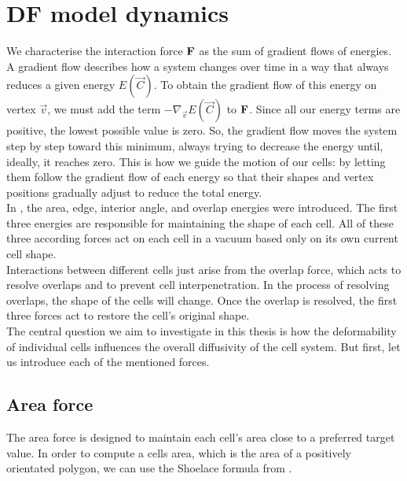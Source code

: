 \section{DF model dynamics} 
We characterise the interaction force $\mathbf{F}$ as the sum of gradient flows of energies. \\
A gradient flow describes how a system changes over time in a way that always reduces a given energy $E(\vec{C})$.
To obtain the gradient flow of this energy on vertex $\vec{v}$, we must add the term $-\nabla_{\vec{v}} E(\vec{C})$ to $\mathbf{F}$.
Since all our energy terms are positive, the lowest possible value is zero.  
So, the gradient flow moves the system step by step toward this minimum, always trying to decrease the energy until, ideally, it reaches zero. 
This is how we guide the motion of our cells: by letting them follow the gradient flow of each energy so that their shapes and vertex positions gradually adjust to reduce the total energy. \\
In \cite{Vogel2023}, the area, edge, interior angle, and overlap energies were introduced.
The first three energies are responsible for maintaining the shape of each cell. 
All of these three according forces act on each cell in a vacuum based only on its own current cell shape. \\
Interactions between different cells just arise from the overlap force, which acts to resolve overlaps and to prevent cell interpenetration. 
In the process of resolving overlaps, the shape of the cells will change.  
Once the overlap is resolved, the first three forces act to restore the cell's original shape. \\
The central question we aim to investigate in this thesis is how the deformability of individual cells influences the overall diffusivity of the cell system.
But first, let us introduce each of the mentioned forces. 

\subsection{Area force}
The area force is designed to maintain each cell's area close to a preferred target value. 
In order to compute a cells area, which is the area of a positively orientated polygon, we can use the Shoelace formula from \cite{Shoelace2014}. 

